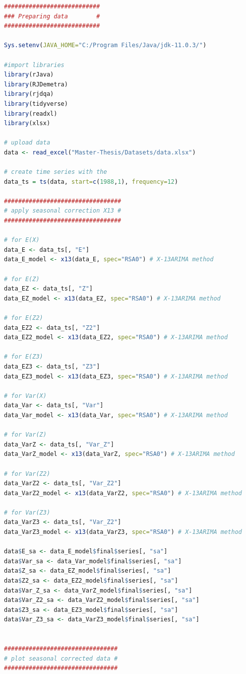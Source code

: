 \documentclass[12pt,a4paper,oneside]{book}
\begin{document}
\begin{lstlisting}[language=R]
###########################
### Preparing data        #
###########################

Sys.setenv(JAVA_HOME="C:/Program Files/Java/jdk-11.0.3/")

#import libraries
library(rJava)
library(RJDemetra)
library(rjdqa)
library(tidyverse)
library(readxl)
library(xlsx)

# upload data
data <- read_excel("Master-Thesis/Datasets/data.xlsx")

# create time series with the 
data_ts = ts(data, start=c(1988,1), frequency=12)

#################################
# apply seasonal correction X13 #
#################################

# for E(X)
data_E <- data_ts[, "E"]
data_E_model <- x13(data_E, spec="RSA0") # X-13ARIMA method

# for E(Z)
data_EZ <- data_ts[, "Z"]
data_EZ_model <- x13(data_EZ, spec="RSA0") # X-13ARIMA method

# for E(Z2)
data_EZ2 <- data_ts[, "Z2"]
data_EZ2_model <- x13(data_EZ2, spec="RSA0") # X-13ARIMA method

# for E(Z3)
data_EZ3 <- data_ts[, "Z3"]
data_EZ3_model <- x13(data_EZ3, spec="RSA0") # X-13ARIMA method

# for Var(X)
data_Var <- data_ts[, "Var"]
data_Var_model <- x13(data_Var, spec="RSA0") # X-13ARIMA method

# for Var(Z)
data_VarZ <- data_ts[, "Var_Z"]
data_VarZ_model <- x13(data_VarZ, spec="RSA0") # X-13ARIMA method

# for Var(Z2)
data_VarZ2 <- data_ts[, "Var_Z2"]
data_VarZ2_model <- x13(data_VarZ2, spec="RSA0") # X-13ARIMA method

# for Var(Z3)
data_VarZ3 <- data_ts[, "Var_Z2"]
data_VarZ3_model <- x13(data_VarZ3, spec="RSA0") # X-13ARIMA method

data$E_sa <- data_E_model$final$series[, "sa"]
data$Var_sa <- data_Var_model$final$series[, "sa"]
data$Z_sa <- data_EZ_model$final$series[, "sa"]
data$Z2_sa <- data_EZ2_model$final$series[, "sa"]
data$Var_Z_sa <- data_VarZ_model$final$series[, "sa"]
data$Var_Z2_sa <- data_VarZ2_model$final$series[, "sa"]
data$Z3_sa <- data_EZ3_model$final$series[, "sa"]
data$Var_Z3_sa <- data_VarZ3_model$final$series[, "sa"]


################################
# plot seasonal corrected data #
################################


\end{lstlisting}
\end{document}
